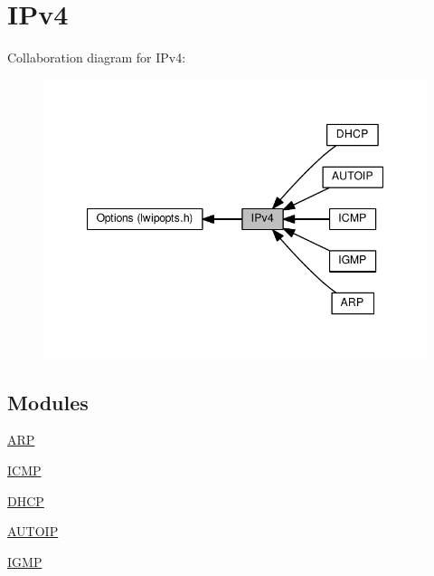 \hypertarget{group__lwip__opts__ipv4}{}\section{I\+Pv4}
\label{group__lwip__opts__ipv4}
Collaboration diagram for I\+Pv4\+:
\nopagebreak
\begin{figure}[H]
\begin{center}
\leavevmode
\includegraphics[width=347pt]{group__lwip__opts__ipv4}
\end{center}
\end{figure}
\subsection*{Modules}
\begin{DoxyCompactItemize}
\item 
\hyperlink{group__lwip__opts__arp}{A\+RP}
\item 
\hyperlink{group__lwip__opts__icmp}{I\+C\+MP}
\item 
\hyperlink{group__lwip__opts__dhcp}{D\+H\+CP}
\item 
\hyperlink{group__lwip__opts__autoip}{A\+U\+T\+O\+IP}
\item 
\hyperlink{group__lwip__opts__igmp}{I\+G\+MP}
\end{DoxyCompactItemize}
